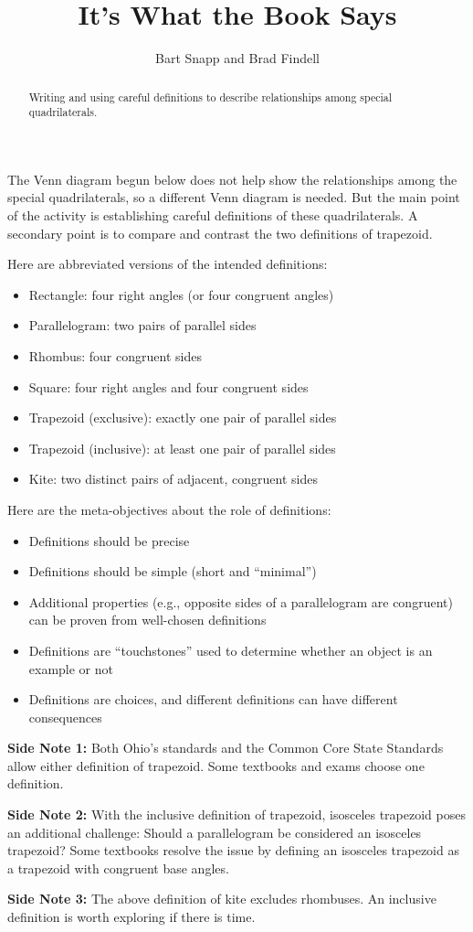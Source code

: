 \documentclass{ximera}
\author{Bart Snapp and Brad Findell}
\title{It's What the Book Says}
\begin{document}
\begin{abstract}
Writing and using careful definitions to describe relationships among special quadrilaterals.  
\end{abstract}
\maketitle


\begin{instructorIntro}
The Venn diagram begun below does not help show the relationships among the special quadrilaterals, so a different Venn diagram is needed.  But the main point of the activity is establishing careful definitions of these quadrilaterals.  A secondary point is to compare and contrast the two definitions of trapezoid.  

Here are abbreviated versions of the intended definitions: 
\begin{itemize}\itemsep0em
\item Rectangle:  four right angles (or four congruent angles)
\item Parallelogram:  two pairs of parallel sides
\item Rhombus:  four congruent sides
\item Square:  four right angles and four congruent sides
\item Trapezoid (exclusive): exactly one pair of parallel sides
\item Trapezoid (inclusive): at least one pair of parallel sides
\item Kite: two distinct pairs of adjacent, congruent sides
\end{itemize}

Here are the meta-objectives about the role of definitions:  
\begin{itemize}\itemsep0em
\item Definitions should be precise
\item Definitions should be simple (short and ``minimal'')
\item Additional properties (e.g., opposite sides of a parallelogram are congruent) can be proven from well-chosen definitions 
\item Definitions are ``touchstones'' used to determine whether an object is an example or not
\item Definitions are choices, and different definitions can have different consequences
\end{itemize}

\textbf{Side Note 1:} Both Ohio's standards and the Common Core State Standards allow either definition of trapezoid.  Some textbooks and exams choose one definition.  

\textbf{Side Note 2:} With the inclusive definition of trapezoid, isosceles trapezoid poses an additional challenge:  Should a parallelogram be considered an isosceles trapezoid?  Some textbooks resolve the issue by defining an isosceles trapezoid as a trapezoid with congruent base angles.    

\textbf{Side Note 3:} The above definition of kite excludes rhombuses.  An inclusive definition is worth exploring if there is time.  

\end{instructorIntro}
\end{document}
